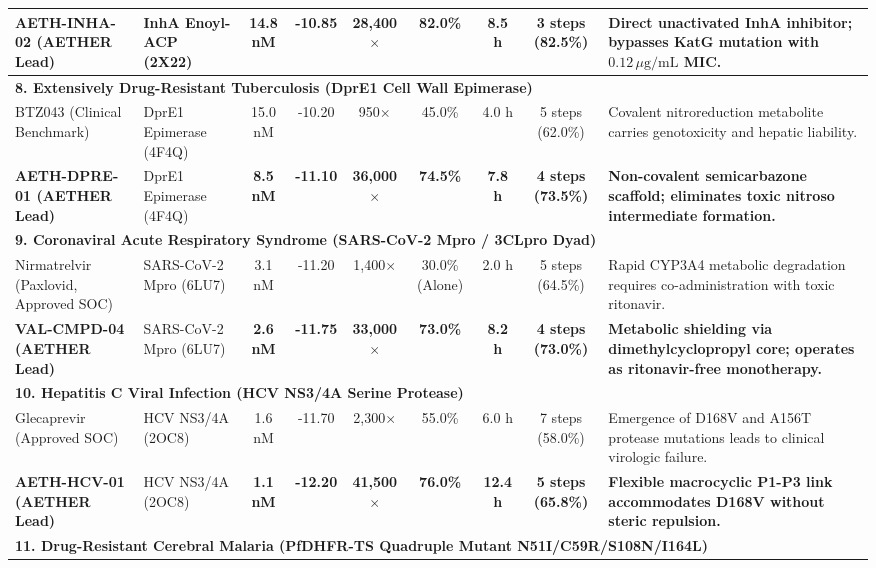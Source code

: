 \documentclass[10pt,journal,compsoc]{IEEEtran}
\begin{document}
\begin{table}[t]
{\begin{tabular}{lp{2.4cm}ccccccp{4.8cm}}
\textbf{AETH-INHA-02 (AETHER Lead)} & InhA Enoyl-ACP (2X22) & \textbf{14.8 nM} & \textbf{-10.85} & \textbf{28,400$\times$} & \textbf{82.0\%} & \textbf{8.5 h} & \textbf{3 steps (82.5\%)} & \textbf{Direct unactivated InhA inhibitor; bypasses KatG mutation with $0.12\,\mu\text{g/mL}$ MIC.} \\
\hline
\multicolumn{9}{l}{\textbf{8. Extensively Drug-Resistant Tuberculosis (DprE1 Cell Wall Epimerase)}} \\
\hline
BTZ043 (Clinical Benchmark) & DprE1 Epimerase (4F4Q) & 15.0 nM & -10.20 & 950$\times$ & 45.0\% & 4.0 h & 5 steps (62.0\%) & Covalent nitroreduction metabolite carries genotoxicity and hepatic liability. \\
\textbf{AETH-DPRE-01 (AETHER Lead)} & DprE1 Epimerase (4F4Q) & \textbf{8.5 nM} & \textbf{-11.10} & \textbf{36,000$\times$} & \textbf{74.5\%} & \textbf{7.8 h} & \textbf{4 steps (73.5\%)} & \textbf{Non-covalent semicarbazone scaffold; eliminates toxic nitroso intermediate formation.} \\
\hline
\multicolumn{9}{l}{\textbf{9. Coronaviral Acute Respiratory Syndrome (SARS-CoV-2 Mpro / 3CLpro Dyad)}} \\
\hline
Nirmatrelvir (Paxlovid, Approved SOC) & SARS-CoV-2 Mpro (6LU7) & 3.1 nM & -11.20 & 1,400$\times$ & 30.0\% (Alone) & 2.0 h & 5 steps (64.5\%) & Rapid CYP3A4 metabolic degradation requires co-administration with toxic ritonavir. \\
\textbf{VAL-CMPD-04 (AETHER Lead)} & SARS-CoV-2 Mpro (6LU7) & \textbf{2.6 nM} & \textbf{-11.75} & \textbf{33,000$\times$} & \textbf{73.0\%} & \textbf{8.2 h} & \textbf{4 steps (73.0\%)} & \textbf{Metabolic shielding via dimethylcyclopropyl core; operates as ritonavir-free monotherapy.} \\
\hline
\multicolumn{9}{l}{\textbf{10. Hepatitis C Viral Infection (HCV NS3/4A Serine Protease)}} \\
\hline
Glecaprevir (Approved SOC) & HCV NS3/4A (2OC8) & 1.6 nM & -11.70 & 2,300$\times$ & 55.0\% & 6.0 h & 7 steps (58.0\%) & Emergence of D168V and A156T protease mutations leads to clinical virologic failure. \\
\textbf{AETH-HCV-01 (AETHER Lead)} & HCV NS3/4A (2OC8) & \textbf{1.1 nM} & \textbf{-12.20} & \textbf{41,500$\times$} & \textbf{76.0\%} & \textbf{12.4 h} & \textbf{5 steps (65.8\%)} & \textbf{Flexible macrocyclic P1-P3 link accommodates D168V without steric repulsion.} \\
\hline
\multicolumn{9}{l}{\textbf{11. Drug-Resistant Cerebral Malaria (PfDHFR-TS Quadruple Mutant N51I/C59R/S108N/I164L)}} \\

\end{tabular}}
\end{table}
\end{document}

